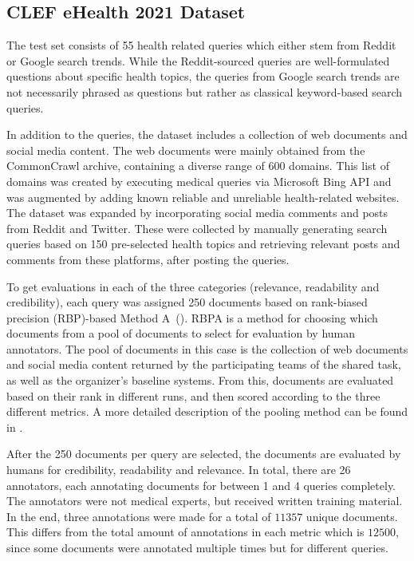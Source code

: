 \subsection{CLEF eHealth 2021 Dataset}
The test set consists of 55 health related queries which either stem from Reddit or Google search trends.
While the Reddit-sourced queries are well-formulated questions about specific health topics, the queries from Google search trends are not necessarily phrased as questions but rather as classical keyword-based search queries.


In addition to the queries, the dataset includes a collection of web documents and social media content.
The web documents were mainly obtained from the CommonCrawl archive, containing a diverse range of 600 domains.
This list of domains was created by executing medical queries via Microsoft Bing API and was augmented by adding known reliable and unreliable health-related websites.
The dataset was expanded by incorporating social media comments and posts from Reddit and Twitter.
These were collected by manually generating search queries based on 150 pre-selected health topics and retrieving relevant posts and comments from these platforms, after posting the queries.

To get evaluations in each of the three categories (relevance, readability and credibility), each query was assigned 250 documents based on rank-biased precision (RBP)-based Method A~(\cite{moffat:2008:Rank}).
RBPA is a method for choosing which documents from a pool of documents to select for evaluation by human annotators.
The pool of documents in this case is the collection of web documents and social media content returned by the participating teams of the shared task, as well as the organizer's baseline systems.
From this, documents are evaluated based on their rank in different runs, and then scored according to the three different metrics.
A more detailed description of the pooling method can be found in \cite{lipani:2017:Fixed}.

After the 250 documents per query are selected, the documents are evaluated by humans for credibility, readability and relevance.
In total, there are 26 annotators, each annotating documents for between 1 and 4 queries completely.
The annotators were not medical experts, but received written training material.
In the end, three annotations were made for  a total of $11 357$ unique documents.
This differs from the total amount of annotations in each metric which is $12 500$, since some documents were annotated multiple times but for different queries.

